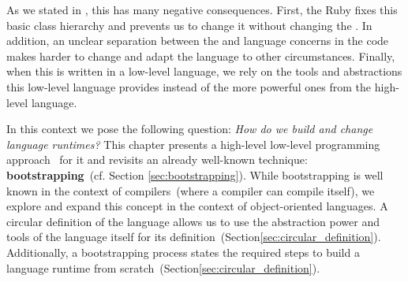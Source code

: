 As we stated in , this has many negative consequences. First, the Ruby \VM fixes this basic class hierarchy and prevents us to change it without changing the \VM.
In addition, an unclear separation between the \VM and language concerns in the \VM code makes harder to change and adapt the language to other circumstances. Finally, when this \VM is written in a low-level language, we rely on the tools and abstractions this low-level language provides instead of the more powerful ones from the high-level language. 




In this context we pose the following question: \emph{How do we build and change language runtimes?} This chapter presents a high-level low-level programming approach~\cite{Fram09a} for it and revisits an already well-known technique: \textbf{bootstrapping}~(cf. Section \ref{sec:bootstrapping}). While bootstrapping is well known in the context of compilers~(where a compiler can compile itself), we explore and expand this concept in the context of object-oriented languages. A circular definition of the language allows us to use the abstraction power and tools of the language itself for its definition~(Section\ref{sec:circular_definition}). Additionally, a bootstrapping process states the required steps to build a language runtime from scratch~(Section\ref{sec:circular_definition}).

